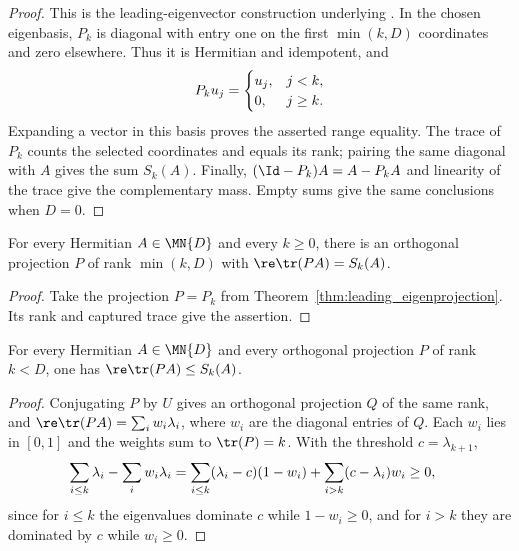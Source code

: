 \begin{proof}\leanok
    This is the leading-eigenvector construction underlying
    \cite[Chapter~3, Lemma~3.1]{Wolf2012Quantum}.
    In the chosen eigenbasis, $P_k$ is diagonal with entry one on the
    first $\min(k,D)$ coordinates and zero elsewhere. Thus it is Hermitian
    and idempotent, and
    \begin{align}
        P_ku_j=
        \begin{cases}
            u_j, & j<k,    \\
            0,   & j\ge k.
        \end{cases}\notag
    \end{align}
    Expanding a vector in this basis proves the asserted range equality.
    The trace of $P_k$ counts the selected coordinates and equals its rank;
    pairing the same diagonal with $A$ gives the sum $S_k(A)$.
    Finally, $(\Id-P_k)A=A-P_kA$ and linearity of the trace give the
    complementary mass. Empty sums give the same conclusions when $D=0$.
\end{proof}

\begin{theorem}
    \label{thm:ky_fan_achievability}
    \leanok
    For every Hermitian $A\in\MN{D}$ and every $k\ge0$, there is an orthogonal
    projection $P$ of rank $\min(k,D)$ with $\re\tr(PA)=S_k(A)$.
\end{theorem}

\begin{proof}\leanok
    Take the projection $P=P_k$ from Theorem~\ref{thm:leading_eigenprojection}.
    Its rank and captured trace give the assertion.
\end{proof}

\begin{theorem}
    \label{thm:ky_fan_upper_bound}
    \leanok
    For every Hermitian $A\in\MN{D}$ and every orthogonal projection $P$ of
    rank $k<D$, one has $\re\tr(PA)\le S_k(A)$.
\end{theorem}

\begin{proof}\leanok
    Conjugating $P$ by $U$ gives an orthogonal projection $Q$ of the same
    rank, and $\re\tr(PA)=\sum_iw_i\lambda_i$, where $w_i$ are the diagonal
    entries of $Q$. Each $w_i$ lies in $[0,1]$ and the weights sum to
    $\tr(P)=k$. With the threshold $c=\lambda_{k+1}$,
    \begin{align}
        \sum_{i\le k}\lambda_i-\sum_iw_i\lambda_i
         & =\sum_{i\le k}(\lambda_i-c)(1-w_i)
        +\sum_{i>k}(c-\lambda_i)w_i
        \ge0,
        \notag
    \end{align}
    since for $i\le k$ the eigenvalues dominate $c$ while $1-w_i\ge0$, and
    for $i>k$ they are dominated by $c$ while $w_i\ge0$.
\end{proof}


